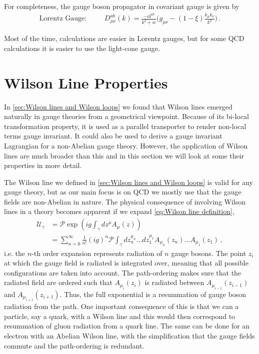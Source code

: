 For completeness, the gauge boson propagator in covariant gauge is given by
\begin{align}\label{eq:covariant propagator}
    \text{Lorentz Gauge}:\hspace{1cm}D_{\mu\nu}^{ab}(k)=\frac{-i\delta^{ab}}{k^{2}+i\epsilon}\Big(g_{\mu\nu}-(1-\xi)\frac{k_{\mu}k_{\nu}}{k^{2}}\Big)\,.
\end{align}

Most of the time, calculations are easier in Lorentz gauges, but for some QCD calculations it is easier to use the light-cone gauge.


\section{Wilson Line Properties}\label{sec:wilson line properties}
In \cref{sec:Wilson lines and Wilson loops} we found that Wilson lines emerged naturally in gauge theories from a geometrical viewpoint. Because of its bi-local transformation property, it is used as a parallel transporter to render non-local terms gauge invariant. It could also be used to derive a gauge invariant Lagrangian for a non-Abelian gauge theory.  However, the application of Wilson lines are much broader than this and in this section we will look at some their properties in more detail.

The Wilson line we defined in \cref{sec:Wilson lines and Wilson loops} is valid for any gauge theory, but as our main focus is on QCD we mostly use that the gauge fields are non-Abelian in nature. The physical consequence of involving Wilson lines in a theory becomes apparent if we expand \cref{eq:Wilson line definition},
\begin{align}\label{eq:Expansion n-order Wilson line}
\mathcal{U}_{\gamma}&=\mathcal{P}\exp(ig\int_{\gamma}dz^{\mu}A_{\mu}(z))\nonumber
\\
&=\sum_{n=0}^{\infty}\frac{1}{n!}(ig)^{n}\mathcal{P}\int_{\gamma}dz_{n}^{\mu_n}\dots dz_{1}^{\mu_1}A_{\mu_n}(z_n)\dots A_{\mu_1}(z_1)\,,
\end{align}
i.e. the $n$-th order expansion represents radiation of $n$ gauge bosons. The point $z_i$ at which the gauge field is radiated is integrated over, meaning that all possible configurations are taken into account. The path-ordering makes sure that the radiated field are ordered such that $A_{\mu_i}(z_i)$ is radiated between $A_{\mu_{i-1}}(z_{i-1})$ and $A_{\mu_{i+1}}(z_{i+1})$. Thus, the full exponential is a resummation of gauge boson radiation from the path. One important consequence of this is that we can  a particle, say a quark, with a Wilson line and this would then correspond to resummation of gluon radiation from a quark line. The same can be done for an electron with an Abelian Wilson line, with the simplification that the gauge fields commute and the path-ordering is redundant. 

